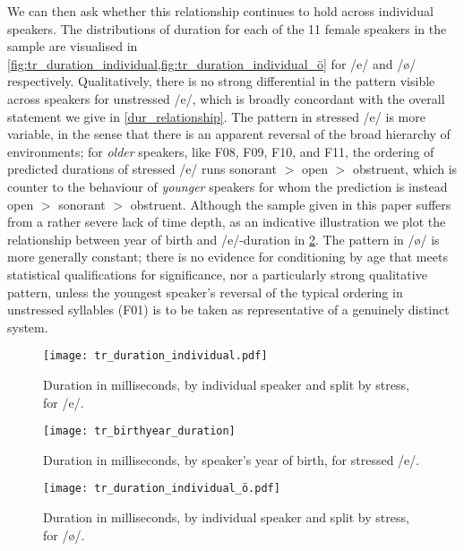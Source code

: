 We can then ask whether this relationship continues to hold across individual speakers. The distributions of duration for each of the 11 female speakers in the sample are visualised in \cref{fig:tr_duration_individual,fig:tr_duration_individual_ö} for /e/ and /ø/ respectively. Qualitatively, there is no strong differential in the pattern visible across speakers for unstressed /e/, which is broadly concordant with the overall statement we give in \cref{dur_relationship}. The pattern in stressed /e/ is more variable, in the sense that there is an apparent reversal of the broad hierarchy of environments; for \emph{older} speakers, like F08, F09, F10, and F11, the ordering of predicted durations of stressed /e/ runs sonorant $>$ open $>$ obstruent, which is counter to the behaviour of \emph{younger} speakers for whom the prediction is instead open $>$ sonorant $>$ obstruent. Although the sample given in this paper suffers from a rather severe lack of time depth, as an indicative illustration we plot the relationship between year of birth and /e/-duration in \cref{fig:tr_duration_e_birthyear}. The pattern in /ø/ is more generally constant; there is no evidence for conditioning by age that meets statistical qualifications for significance, nor a particularly strong qualitative pattern, unless the youngest speaker's reversal of the typical ordering in unstressed syllables (F01) is to be taken as representative of a genuinely distinct system.

\begin{figure}[ht]
  \texttt{[image: tr\_duration\_individual.pdf]}
  \caption[Duration (ms) by individual speaker, for /e/.]{Duration in milliseconds, by individual speaker and split by stress, for /e/.}
  \label{fig:tr_duration_individual}
\end{figure}

\begin{figure}[ht]
\centering
  \texttt{[image: tr\_birthyear\_duration]}
  \caption[Duration (ms) by year of birth of individual speakers, for stressed /e/.]{Duration in milliseconds, by speaker's year of birth, for stressed /e/.}
  \label{fig:tr_duration_e_birthyear}
\end{figure}

\begin{figure}[ht]
  \texttt{[image: tr\_duration\_individual\_ö.pdf]}
  \caption[Duration (ms) by individual speaker, for /ø/.]{Duration in milliseconds, by individual speaker and split by stress, for /ø/.}
  \label{fig:tr_duration_individual_ö}
\end{figure}

